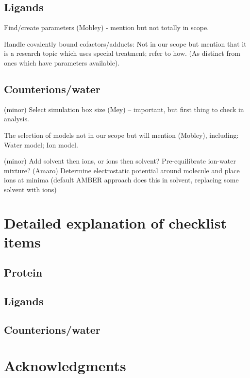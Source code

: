\documentclass[9pt]{livecoms}
\begin{document}
\subsection{Ligands}

Find/create parameters (Mobley) - mention but not totally in scope.

Handle covalently bound cofactors/adducts: Not in our scope but mention that it is a research topic which uses special treatment; refer to how. (As distinct from ones which have parameters available). 

\subsection{Counterions/water}
(minor) Select simulation box size (Mey) -- important, but first thing to check in analysis.

The selection of models not in our scope but will mention (Mobley), including: Water model; Ion model.

(minor) Add solvent then ions, or ions then solvent? Pre-equilibrate ion-water mixture? (Amaro)
Determine electrostatic potential around molecule and place ions at minima (default AMBER approach does this in solvent, replacing some solvent with ions)



\section{Detailed explanation of checklist items}

\subsection{}
\subsection{Protein}



\subsection{Ligands}
\subsection{Counterions/water}



\section{Acknowledgments}




\end{document}

